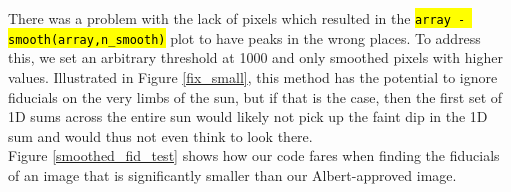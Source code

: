 \documentclass[10pt]{scrartcl}
\begin{document}


There was a problem with the lack of pixels which resulted in the \hl{\texttt{array - smooth(array,n\_smooth)}} plot to have peaks in the wrong places. To address this, we set an arbitrary threshold at 1000 and only smoothed pixels with higher values. Illustrated in Figure \ref{fix_small}, this method has the potential to ignore fiducials on the very limbs of the sun, but if that is the case, then the first set of 1D sums across the entire sun would likely not pick up the faint dip in the 1D sum and would thus not even think to look there. \\
\indent Figure \ref{smoothed_fid_test} shows how our code fares when finding the fiducials of an image that is significantly smaller than our Albert-approved image.
\end{document}
